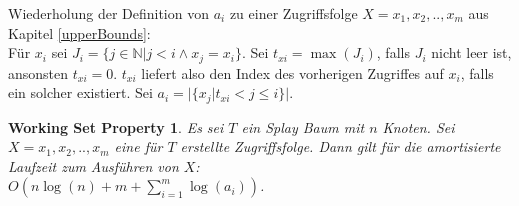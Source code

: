 \documentclass[a4paper,12pt]{article}
\begin{document}
\noindent Wiederholung der Definition von $a_i$ zu einer Zugriffsfolge $X = x_1, x_2,.., x_m$ aus Kapitel \ref{upperBounds}:\\
Für $x_i$ sei $J_i = \{j \in \mathbb{N} \vert j < i \land x_j = x_i \}$.
Sei $t_{xi} = \max \left(J_i\right)$, falls $J_i$ nicht leer ist, ansonsten $t_{xi} = 0$. $t_{xi}$ liefert also den Index des vorherigen Zugriffes auf $x_i$, falls ein solcher existiert. Sei ${a_i = \vert\{x_j \vert t_{xi} < j \leq i   \} \vert }$.

\newtheorem{Satz2}{Working Set Property}[section] \label{workingSetSplay}
\begin{Satz2} Es sei $T$ ein Splay Baum mit $n$ Knoten. Sei $X = x_1,x_2,..,x_m$ eine für $T$ erstellte Zugriffsfolge. Dann gilt für die amortisierte Laufzeit zum Ausführen von $X$: \\
	$O\left( n \log\left(n\right) + m +\sum_{i = 1}^{m} \log\left( a_i\right) \right)$.
\end{Satz2}
\end{document}
